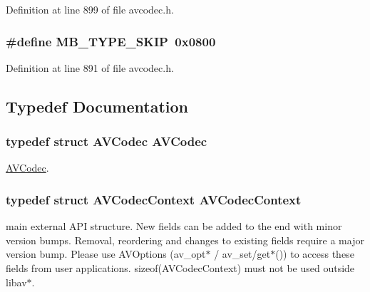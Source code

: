 Definition at line 899 of file avcodec.\+h.

\subsubsection[{\texorpdfstring{M\+B\+\_\+\+T\+Y\+P\+E\+\_\+\+S\+K\+IP}{MB_TYPE_SKIP}}]{\setlength{\rightskip}{0pt plus 5cm}\#define M\+B\+\_\+\+T\+Y\+P\+E\+\_\+\+S\+K\+IP~0x0800}\hypertarget{group__lavc__core_ga688562b0eee1a11bb18e6c76d1aa16ad}{}\label{group__lavc__core_ga688562b0eee1a11bb18e6c76d1aa16ad}


Definition at line 891 of file avcodec.\+h.



\subsection{Typedef Documentation}
\subsubsection[{\texorpdfstring{A\+V\+Codec}{AVCodec}}]{\setlength{\rightskip}{0pt plus 5cm}typedef struct {\bf A\+V\+Codec}  {\bf A\+V\+Codec}}\hypertarget{group__lavc__core_gadf7f78e11dffa2bcb0419221625e5623}{}\label{group__lavc__core_gadf7f78e11dffa2bcb0419221625e5623}
\hyperlink{struct_a_v_codec}{A\+V\+Codec}. 
\subsubsection[{\texorpdfstring{A\+V\+Codec\+Context}{AVCodecContext}}]{\setlength{\rightskip}{0pt plus 5cm}typedef struct {\bf A\+V\+Codec\+Context}  {\bf A\+V\+Codec\+Context}}\hypertarget{group__lavc__core_gaf356dfbde1f9f8a35068ad9466c4afea}{}\label{group__lavc__core_gaf356dfbde1f9f8a35068ad9466c4afea}
main external A\+PI structure. New fields can be added to the end with minor version bumps. Removal, reordering and changes to existing fields require a major version bump. Please use A\+V\+Options (av\+\_\+opt$\ast$ / av\+\_\+set/get$\ast$()) to access these fields from user applications. sizeof(\+A\+V\+Codec\+Context) must not be used outside libav$\ast$. 
